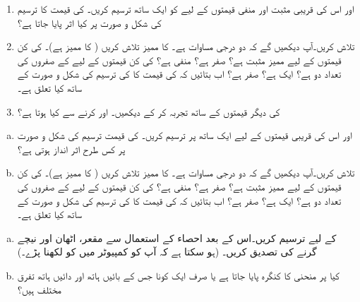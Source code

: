 \begin{enumerate}
\item
{} اور  اس کی قریبی مثبت اور منفی قیمتوں کے لیے  کو ایک ساتھ ترسیم کریں۔ کی قیمت کا ترسیم کی شکل و صورت پر کیا اثر پایا جاتا ہے؟
\item
{} تلاش کریں۔آپ دیکھیں گے کہ  دو درجی مساوات ہے۔  کا ممیز تلاش کریں ( کا ممیز  ہے)۔  کی کن قیمتوں کے لیے ممیز مثبت ہے؟ صفر ہے؟ منفی ہے؟  کی کن قیمتوں کے لیے  کے  صفروں کی تعداد دو ہے؟ ایک ہے؟  صفر ہے؟ اب بتائیں کہ  کی قیمت کا  کی ترسیم کی شکل و  صورت کے ساتھ کیا تعلق ہے۔
\item
{} کی دیگر قیمتوں کے ساتھ تجربہ کر کے دیکھیں۔  اور  کرنے سے کیا ہوتا ہے؟
\end{enumerate}
\begin{enumerate}[a.]
\item
{} اور اس کی  قریبی قیمتوں کے لیے  ایک ساتھ  پر  ترسیم کریں۔  کی قیمت ترسیم کی  شکل و صورت پر کس طرح اثر انداز ہوتی ہے؟
\item
{} تلاش کریں۔آپ دیکھیں گے کہ  دو درجی مساوات ہے۔  کا ممیز تلاش کریں ( کا ممیز  ہے)۔  کی کن قیمتوں کے لیے ممیز مثبت ہے؟ صفر ہے؟ منفی ہے؟  کی کن قیمتوں کے لیے  کے  صفروں کی تعداد دو ہے؟ ایک ہے؟  صفر ہے؟ اب بتائیں کہ  کی قیمت کا  کی ترسیم کی شکل و  صورت کے ساتھ کیا تعلق ہے۔
\end{enumerate}
\begin{enumerate}[a.]
\item
{} کے لیے  ترسیم کریں۔اس کے بعد احصاء کے استعمال سے مقعر، اٹھان اور نیچے گرنے کی تصدیق کریں۔ (ہو سکتا ہے کہ آپ کو کمپیوٹر میں  کو  لکھنا پڑے۔)
\item
کیا  پر منحنی کا کنگرہ پایا جاتا ہے یا صرف ایک کونا جس کے بائیں ہاتھ اور دائیں ہاتھ تفرق مختلف ہیں؟
\end{enumerate}
